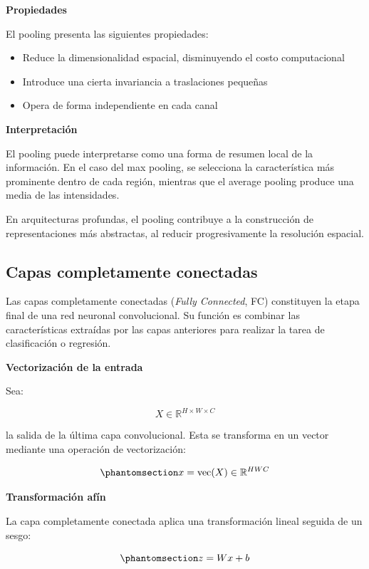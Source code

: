 \documentclass[
  spanish,
  us-letterpaper,
]{scrreprt}
\providecommand{\tightlist}{%
  \setlength{\itemsep}{0pt}\setlength{\parskip}{0pt}}
\theoremstyle{definition}
\theoremstyle{remark}
\begin{document}
\textbf{Propiedades}

El pooling presenta las siguientes propiedades:

\begin{itemize}
\tightlist
\item
  Reduce la dimensionalidad espacial, disminuyendo el costo
  computacional
\item
  Introduce una cierta invariancia a traslaciones pequeñas
\item
  Opera de forma independiente en cada canal
\end{itemize}

\textbf{Interpretación}

El pooling puede interpretarse como una forma de resumen local de la
información. En el caso del max pooling, se selecciona la característica
más prominente dentro de cada región, mientras que el average pooling
produce una media de las intensidades.

En arquitecturas profundas, el pooling contribuye a la construcción de
representaciones más abstractas, al reducir progresivamente la
resolución espacial.

\subsection{Capas completamente
conectadas}\label{capas-completamente-conectadas}

Las capas completamente conectadas (\emph{Fully Connected}, FC)
constituyen la etapa final de una red neuronal convolucional. Su función
es combinar las características extraídas por las capas anteriores para
realizar la tarea de clasificación o regresión.

\textbf{Vectorización de la entrada}

Sea:

\[
X \in \mathbb{R}^{H \times W \times C}
\]

la salida de la última capa convolucional. Esta se transforma en un
vector mediante una operación de vectorización:

\begin{equation}\phantomsection\label{eq-vectorizacion-fc}{
x = \mathrm{vec}(X) \in \mathbb{R}^{HWC}
}\end{equation}

\textbf{Transformación afín}

La capa completamente conectada aplica una transformación lineal seguida
de un sesgo:

\begin{equation}\phantomsection\label{eq-fc-lineal}{
z = Wx + b
}\end{equation}
\end{document}

